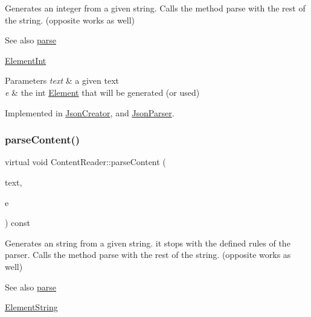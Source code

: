 Generates an integer from a given string. Calls the method parse with the rest of the string. (opposite works as well) \begin{DoxySeeAlso}{See also}
\mbox{\hyperlink{classContentReader_a7fff2e63a2e8fa216665604f69974e1d}{parse}} 

\mbox{\hyperlink{classElementInt}{Element\+Int}}
\end{DoxySeeAlso}

\begin{DoxyParams}{Parameters}
{\em text} & a given text \\
\hline
{\em e} & the int \mbox{\hyperlink{classElement}{Element}} that will be generated (or used) \\
\hline
\end{DoxyParams}


Implemented in \mbox{\hyperlink{classJsonCreator_a0fe34794ee3563c3e0bc35006129fcdc}{Json\+Creator}}, and \mbox{\hyperlink{classJsonParser_ac80cf84ff2565f4c1f3a0f5ddb559c96}{Json\+Parser}}.

\mbox{\label{classContentReader_a310678ddc37a05aca2f13db73b22abe5}} 
\subsubsection{\texorpdfstring{parse\+Content()}{parseContent()}\hspace{0.1cm}{\footnotesize\ttfamily [2/6]}}
{\footnotesize\ttfamily virtual void Content\+Reader\+::parse\+Content (\begin{DoxyParamCaption}\item[{std\+::string \&}]{text,  }\item[{\mbox{\hyperlink{classElementString}{Element\+String}} $\ast$}]{e }\end{DoxyParamCaption}) const\hspace{0.3cm}{\ttfamily [pure virtual]}}

Generates an string from a given string. it stops with the defined rules of the parser. Calls the method parse with the rest of the string. (opposite works as well) \begin{DoxySeeAlso}{See also}
\mbox{\hyperlink{classContentReader_a7fff2e63a2e8fa216665604f69974e1d}{parse}} 

\mbox{\hyperlink{classElementString}{Element\+String}}
\end{DoxySeeAlso}


